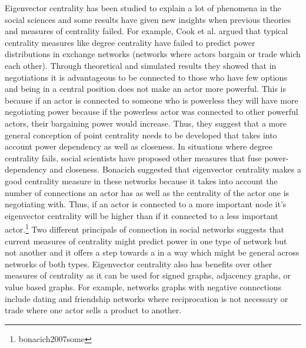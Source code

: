 \documentclass{article}
\theoremstyle{definition}
\theoremstyle{remark}
\begin{document}
Eigenvector centrality has been studied to explain a lot of phenomena in the social sciences and some results have given new insights when previous theories and measures of centrality failed.  For example, Cook et al. argued that typical centrality measures like degree centrality have failed to predict power distributions in exchange networks (networks where actors bargain or trade which each other).\cite{cook1983distribution}  Through theoretical and simulated results they showed that in negotiations it is advantageous to be connected to those who have few options and being in a central position does not make an actor more powerful.  This is because if an actor is connected to someone who is powerless they will have more negotiating power because if the powerless actor was connected to other powerful actors, their bargaining power would increase.  Thus, they suggest that a more general conception of point centrality needs to be developed that takes into account power dependency as well as closeness.  In situations where degree centrality fails, social scientists have proposed other measures that fuse power-dependency and closeness.  Bonacich suggested that eigenvector centrality makes a good centrality measure in these networks because it takes into account the number of connections an actor has as well as the centrality of the actor one is negotiating with.\cite{bonacich1987power}  Thus, if an actor is connected to a more important node it's eigenvector centrality will be higher than if it connected to a less important actor.\footnote{bonacich2007some}  Two different principals of connection in social networks suggests that current measures of centrality might predict power in one type of network but not another and it offers a step towards a  in a way which might be general across networks of both types.  Eigenvector centrality also has benefits over other measures of centrality as it can be used for signed graphs, adjacency graphs, or value based graphs.  For example, networks graphs with negative connections include dating and friendship networks where reciprocation is not necessary or trade where one actor sells a product to another. \\
\end{document}
